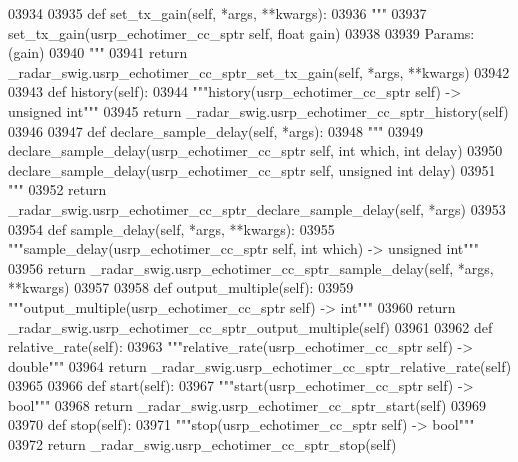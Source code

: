 \begin{DoxyCode}
{{{{{{{{{{{{{{03934 
03935     \textcolor{keyword}{def }set_tx_gain(self, *args, **kwargs):
03936         \textcolor{stringliteral}{"""}
03937 \textcolor{stringliteral}{        set\_tx\_gain(usrp\_echotimer\_cc\_sptr self, float gain)}
03938 \textcolor{stringliteral}{}
03939 \textcolor{stringliteral}{        Params: (gain)}
03940 \textcolor{stringliteral}{        """}
03941         \textcolor{keywordflow}{return} \_radar\_swig.usrp\_echotimer\_cc\_sptr\_set\_tx\_gain(self, *args, **kwargs)
03942 
03943     \textcolor{keyword}{def }history(self):
03944         \textcolor{stringliteral}{"""history(usrp\_echotimer\_cc\_sptr self) -> unsigned int"""}
03945         \textcolor{keywordflow}{return} \_radar\_swig.usrp\_echotimer\_cc\_sptr\_history(self)
03946 
03947     \textcolor{keyword}{def }declare_sample_delay(self, *args):
03948         \textcolor{stringliteral}{"""}
03949 \textcolor{stringliteral}{        declare\_sample\_delay(usrp\_echotimer\_cc\_sptr self, int which, int delay)}
03950 \textcolor{stringliteral}{        declare\_sample\_delay(usrp\_echotimer\_cc\_sptr self, unsigned int delay)}
03951 \textcolor{stringliteral}{        """}
03952         \textcolor{keywordflow}{return} \_radar\_swig.usrp\_echotimer\_cc\_sptr\_declare\_sample\_delay(self, *args)
03953 
03954     \textcolor{keyword}{def }sample_delay(self, *args, **kwargs):
03955         \textcolor{stringliteral}{"""sample\_delay(usrp\_echotimer\_cc\_sptr self, int which) -> unsigned int"""}
03956         \textcolor{keywordflow}{return} \_radar\_swig.usrp\_echotimer\_cc\_sptr\_sample\_delay(self, *args, **kwargs)
03957 
03958     \textcolor{keyword}{def }output_multiple(self):
03959         \textcolor{stringliteral}{"""output\_multiple(usrp\_echotimer\_cc\_sptr self) -> int"""}
03960         \textcolor{keywordflow}{return} \_radar\_swig.usrp\_echotimer\_cc\_sptr\_output\_multiple(self)
03961 
03962     \textcolor{keyword}{def }relative_rate(self):
03963         \textcolor{stringliteral}{"""relative\_rate(usrp\_echotimer\_cc\_sptr self) -> double"""}
03964         \textcolor{keywordflow}{return} \_radar\_swig.usrp\_echotimer\_cc\_sptr\_relative\_rate(self)
03965 
03966     \textcolor{keyword}{def }start(self):
03967         \textcolor{stringliteral}{"""start(usrp\_echotimer\_cc\_sptr self) -> bool"""}
03968         \textcolor{keywordflow}{return} \_radar\_swig.usrp\_echotimer\_cc\_sptr\_start(self)
03969 
03970     \textcolor{keyword}{def }stop(self):
03971         \textcolor{stringliteral}{"""stop(usrp\_echotimer\_cc\_sptr self) -> bool"""}
03972         \textcolor{keywordflow}{return} \_radar\_swig.usrp\_echotimer\_cc\_sptr\_stop(self)
}}}}}}}}}}}}}}
\end{DoxyCode}
